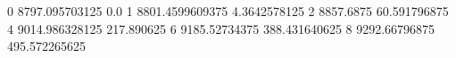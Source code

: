 0 8797.095703125 0.0
1 8801.4599609375 4.3642578125
2 8857.6875 60.591796875
4 9014.986328125 217.890625
6 9185.52734375 388.431640625
8 9292.66796875 495.572265625
